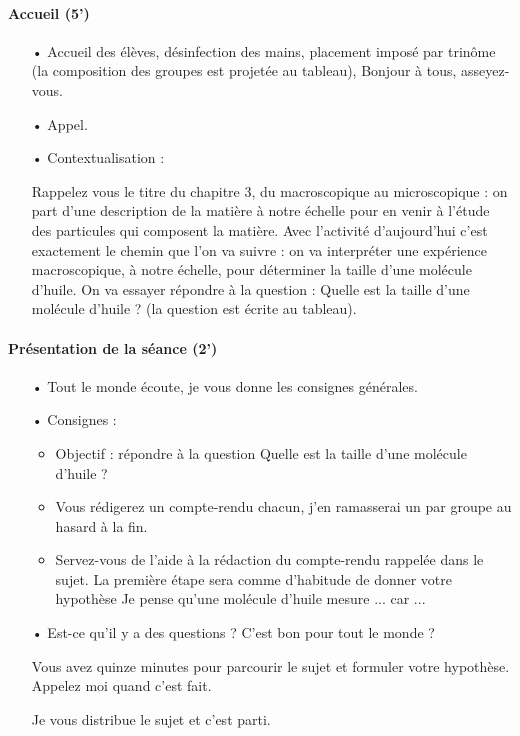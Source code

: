 \documentclass[12pt,a4paper]{article}
\begin{document}
\paragraph{Accueil (5')}
\begin{itemize}
\item[•] Accueil des élèves, désinfection des mains, placement imposé par trinôme (la composition des groupes est projetée au tableau), \og Bonjour à tous, asseyez-vous. \fg{}
\item[•] Appel.
\item[•] Contextualisation : 

\og Rappelez vous le titre du chapitre 3, du macroscopique au microscopique : on part d'une description de la matière à notre échelle pour en venir à l'étude des particules qui composent la matière.
Avec l'activité d'aujourd'hui c'est exactement le chemin que l'on va suivre : on va interpréter une expérience macroscopique, à notre échelle, pour déterminer la taille d'une molécule d'huile.
On va essayer répondre à la question : Quelle est la taille d'une molécule d'huile ?\fg{}
(la question est écrite au tableau).
\end{itemize}

\paragraph{Présentation de la séance (2')}
\begin{itemize}
\item[•]  \og Tout le monde écoute, je vous donne les consignes générales.\fg{}

\item[•] Consignes :
\begin{itemize}
\item Objectif : répondre à la question \og Quelle est la taille d'une molécule d'huile ? \fg{}
\item \og Vous rédigerez un compte-rendu chacun, j'en ramasserai un par groupe au hasard à la fin. \fg{}
\item \og Servez-vous de l'aide à la rédaction du compte-rendu rappelée dans le sujet.
La première étape sera comme d'habitude de donner votre hypothèse \og Je pense qu'une molécule d'huile mesure ... car ... \fg{}
\end{itemize}

\item[•] \og Est-ce qu'il y a des questions ?
C'est bon pour tout le monde ?

Vous avez quinze minutes pour parcourir le sujet et formuler votre hypothèse.
Appelez moi quand c'est fait.

Je vous distribue le sujet et c'est parti.
\fg{}
\end{itemize}
\end{document}
